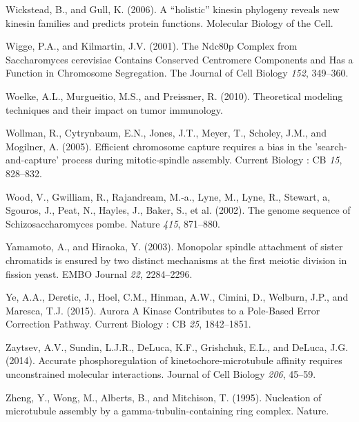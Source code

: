 \documentclass[12pt,a4paper,twoside,openright]{book}
\begin{document}
\hypertarget{ref-Wickstead2006}{}
Wickstead, B., and Gull, K. (2006). A ``holistic'' kinesin phylogeny
reveals new kinesin families and predicts protein functions. Molecular
Biology of the Cell.

\hypertarget{ref-Wigge2001}{}
Wigge, P.A., and Kilmartin, J.V. (2001). The Ndc80p Complex from
Saccharomyces cerevisiae Contains Conserved Centromere Components and
Has a Function in Chromosome Segregation. The Journal of Cell Biology
\emph{152}, 349--360.

\hypertarget{ref-Woelke2010}{}
Woelke, A.L., Murgueitio, M.S., and Preissner, R. (2010). Theoretical
modeling techniques and their impact on tumor immunology.

\hypertarget{ref-Wollman2005}{}
Wollman, R., Cytrynbaum, E.N., Jones, J.T., Meyer, T., Scholey, J.M.,
and Mogilner, A. (2005). Efficient chromosome capture requires a bias in
the 'search-and-capture' process during mitotic-spindle assembly.
Current Biology : CB \emph{15}, 828--832.

\hypertarget{ref-Wood2002a}{}
Wood, V., Gwilliam, R., Rajandream, M.-a., Lyne, M., Lyne, R., Stewart,
a, Sgouros, J., Peat, N., Hayles, J., Baker, S., et al. (2002). The
genome sequence of Schizosaccharomyces pombe. Nature \emph{415},
871--880.

\hypertarget{ref-Yamamoto2003}{}
Yamamoto, A., and Hiraoka, Y. (2003). Monopolar spindle attachment of
sister chromatids is ensured by two distinct mechanisms at the first
meiotic division in fission yeast. EMBO Journal \emph{22}, 2284--2296.

\hypertarget{ref-Ye2015}{}
Ye, A.A., Deretic, J., Hoel, C.M., Hinman, A.W., Cimini, D., Welburn,
J.P., and Maresca, T.J. (2015). Aurora A Kinase Contributes to a
Pole-Based Error Correction Pathway. Current Biology : CB \emph{25},
1842--1851.

\hypertarget{ref-Zaytsev2014}{}
Zaytsev, A.V., Sundin, L.J.R., DeLuca, K.F., Grishchuk, E.L., and
DeLuca, J.G. (2014). Accurate phosphoregulation of
kinetochore-microtubule affinity requires unconstrained molecular
interactions. Journal of Cell Biology \emph{206}, 45--59.

\hypertarget{ref-Zheng1995}{}
Zheng, Y., Wong, M., Alberts, B., and Mitchison, T. (1995). Nucleation
of microtubule assembly by a gamma-tubulin-containing ring complex.
Nature.
\end{document}
